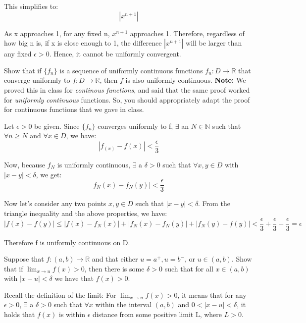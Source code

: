 \documentclass[answers]{exam}
\theoremstyle{remark}
\theoremstyle{definition}
\newcommand{\NN}{\mathbb{N}}
\newcommand{\RR}{\mathbb{R}}
\begin{document}
\begin{questions}
\begin{solution}
This simplifies to:
\[|x^{n+1}|\]

As x approaches 1, for any fixed n, $x^{n+1}$ approaches 1. Therefore, regardless
of how big n is, if x is close enough to 1, the difference $|x^{n+1}|$ will
be larger than any fixed $\epsilon > 0$. Hence, it cannot be uniformly
convergent.

\end{solution}

\question[4] Show that if $\{f_n\}$ is a sequence of uniformly continuous functions $f_n: D \to \RR$ that converge uniformly to $f:D \to \RR$, then $f$ is also uniformly continuous. \textbf{Note:} We proved this in class for \emph{continous functions}, and said that the same proof worked for \emph{uniformly continuous} functions. So, you should appropriately adapt the proof for continuous functions that we gave in class.
\begin{solution}

Let $\epsilon > 0$ be given. Since $\{f_n\}$ converges uniformly to f,
$\exists$ an $N \in \NN$ such that $\forall n \geq N$ and $\forall x \in D$,
we have:
\[|f_(x)-f(x)| < \frac{\epsilon}{3}\]

Now, because $f_N$ is uniformly continuous, $\exists$ a $\delta > 0$
such that $\forall x, y \in D$ with $|x-y| < \delta$, we get:
\[f_N(x) - f_N(y)| < \frac{\epsilon}{3}\]

Now let's consider any two points $x, y \in D$ such that $|x-y| < \delta$. From
the triangle inequality and the above properties, we have:
\[|f(x) - f(y)| \leq |f(x) - f_N(x)| + |f_N(x) - f_N(y)| + |f_N(y) - f(y)| < \frac{\epsilon}{3} + \frac{\epsilon}{3} + \frac{\epsilon}{3} = \epsilon\]

Therefore f is uniformly continuous on D.

\end{solution}

\question[4] Suppose that $f: (a,b) \to \RR$ and that  either $u=a^+, u=b^-$, or $u \in (a,b) $. Show that if $\lim_{x \to u} f(x)>0$, then there is some $\delta >0$ such that for all $ x \in (a,b)$ with $|x-u|< \delta$ we have that $f(x)>0$.
\begin{solution}

Recall the definition of the limit:
For $\lim_{x \to u} f(x) > 0$, it means that for any $\epsilon > 0$,
$\exists$ a $\delta > 0$ such that $\forall x$ within the interval $(a,b)$
and $0 < |x-u| < \delta$, it holds that $f(x)$ is within $\epsilon$ distance
from some positive limit L, where $L > 0$.


\end{solution}
\end{questions}
\end{document}
